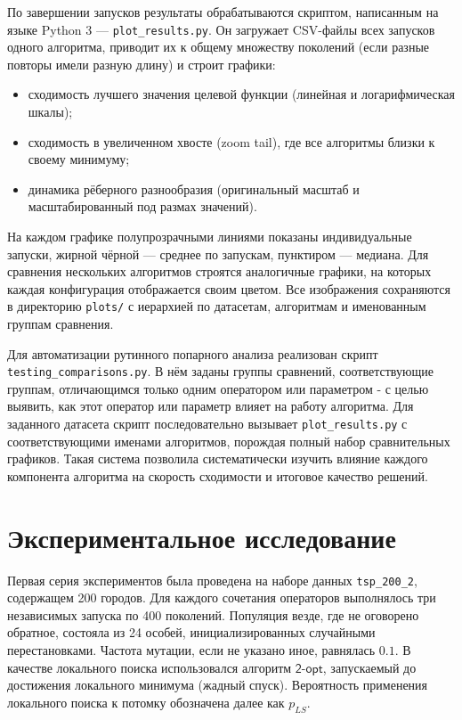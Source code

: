 \documentclass[a4paper,12pt]{article}
\begin{document}
По завершении запусков результаты обрабатываются скриптом, написанным на языке Python 3 --- \texttt{plot\_results.py}. Он загружает CSV-файлы всех запусков одного алгоритма, приводит их к общему множеству поколений (если разные повторы имели разную длину) и строит графики:
\begin{itemize}
\item сходимость лучшего значения целевой функции (линейная и логарифмическая шкалы);
\item сходимость в увеличенном хвосте (zoom tail), где все алгоритмы близки к своему минимуму;
\item динамика рёберного разнообразия (оригинальный масштаб и масштабированный под размах значений).
\end{itemize}
На каждом графике полупрозрачными линиями показаны индивидуальные запуски, жирной чёрной — среднее по запускам, пунктиром — медиана. Для сравнения нескольких алгоритмов строятся аналогичные графики, на которых каждая конфигурация отображается своим цветом. Все изображения сохраняются в директорию \texttt{plots/} с иерархией по датасетам, алгоритмам и именованным группам сравнения.

Для автоматизации рутинного попарного анализа реализован скрипт \texttt{testing\_comparisons.py}. В нём заданы группы сравнений, соответствующие группам, отличающимся только одним оператором или параметром - с целью выявить, как этот оператор или параметр влияет на работу алгоритма. Для заданного датасета скрипт последовательно вызывает \texttt{plot\_results.py} с соответствующими именами алгоритмов, порождая полный набор сравнительных графиков. Такая система позволила систематически изучить влияние каждого компонента алгоритма на скорость сходимости и итоговое качество решений.

\section{Экспериментальное исследование}

Первая серия экспериментов была проведена на наборе данных \texttt{tsp\_200\_2}, содержащем 200 городов. Для каждого сочетания операторов выполнялось три независимых запуска по 400 поколений. Популяция везде, где не оговорено обратное, состояла из 24 особей, инициализированных случайными перестановками. Частота мутации, если не указано иное, равнялась $0.1$. В качестве локального поиска использовался алгоритм $\mathsf{2\mbox{-}opt}$, запускаемый до достижения локального минимума (жадный спуск). Вероятность применения локального поиска к потомку обозначена далее как $p_{LS}$.
\end{document}
